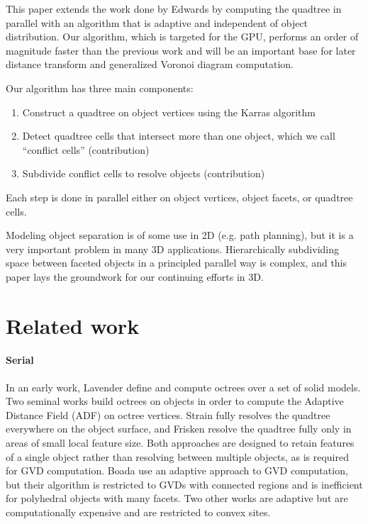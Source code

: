 \documentclass[final,3p,times,twocolumn]{elsarticle}
\begin{document}
This paper extends the work done by Edwards \etal \cite{edwards2015approximating} by computing the quadtree in parallel with an algorithm that is adaptive and independent of object distribution. Our algorithm, which is targeted for the GPU, performs an order of magnitude faster than the previous work and will be an important base for later distance transform and generalized Voronoi diagram computation.

Our algorithm has three main components:

\begin{enumerate}
\item Construct a quadtree on object vertices using the Karras algorithm \cite{karras2012maximizing}
\item Detect quadtree cells that intersect more than one object, which we call ``conflict cells'' (contribution)
\item Subdivide conflict cells to resolve objects (contribution)
\end{enumerate}

Each step is done in parallel either on object vertices, object facets, or quadtree cells.

Modeling object separation is of some use in 2D (e.g. path planning), but it is a very important problem in many 3D applications. Hierarchically subdividing space between faceted objects in a principled parallel way is complex, and this paper lays the groundwork for our continuing efforts in 3D.

\section{Related work}

\paragraph{Serial} In an early work, Lavender \etal {} define and compute octrees over a set of solid models. 
Two seminal works build octrees on objects in order to compute the Adaptive Distance Field (ADF) on octree vertices.  Strain  fully resolves the quadtree everywhere on the object surface, and Frisken \etal {} resolve the quadtree fully only in areas of small local feature size.  Both approaches are designed to retain features of a single object rather than resolving between multiple objects, as is required for GVD computation. Boada \etal {} use an adaptive approach to GVD computation, but their algorithm is restricted to GVDs with connected regions and is inefficient for polyhedral objects with many facets.  Two other works are adaptive \cite{teichmann1997polygonal,vleugels1998approximating} but are computationally expensive and are restricted to convex sites.
\end{document}
